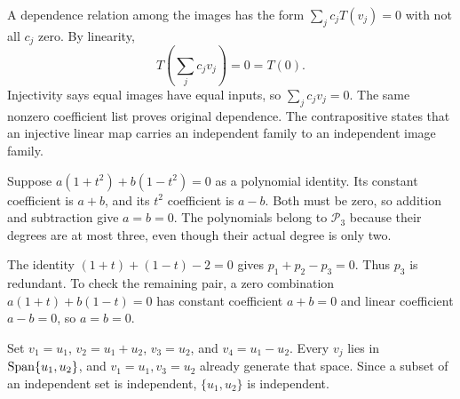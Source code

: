 A dependence relation among the images has the form
$\sum_j c_jT(v_j)=0$ with not all $c_j$ zero. By linearity,
\[
T\left(\sum_jc_jv_j\right)=0=T(0).
\]
Injectivity says equal images have equal inputs, so
$\sum_jc_jv_j=0$. The same nonzero coefficient list proves original
dependence. The contrapositive states that an injective linear map
carries an independent family to an independent image family.

Suppose $a(1+t^2)+b(1-t^2)=0$ as a polynomial identity.
Its constant coefficient is $a+b$, and its $t^2$ coefficient is $a-b$.
Both must be zero, so addition and subtraction give $a=b=0$.
The polynomials belong to $\mathcal P_3$ because their degrees are at
most three, even though their actual degree is only two.

The identity $(1+t)+(1-t)-2=0$ gives $p_1+p_2-p_3=0$.
Thus $p_3$ is redundant. To check the remaining pair, a zero
combination $a(1+t)+b(1-t)=0$ has constant coefficient $a+b=0$
and linear coefficient $a-b=0$, so $a=b=0$.

Set $v_1=u_1$, $v_2=u_1+u_2$, $v_3=u_2$, and
$v_4=u_1-u_2$. Every $v_j$ lies in $\operatorname{Span}\{u_1,u_2\}$, and
$v_1=u_1,v_3=u_2$ already generate that space. Since a subset of
an independent set is independent, $\{u_1,u_2\}$ is independent.

